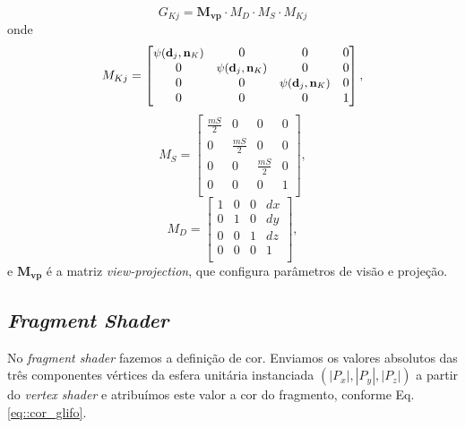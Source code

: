\begin{equation}
    G_{Kj} = \mathbf{M_{vp}}\cdot M_D \cdot M_S \cdot M_{Kj}
\end{equation}
onde 
\begin{equation}
    M_{Kj} = \begin{bmatrix} 
   \mbox{\small $\psi( \mathbf{d}_j, \mathbf{n}_K)$} & 0 & 0 & 0 \\
    0 & \mbox{\small $\psi( \mathbf{d}_j, \mathbf{n}_K)$}  & 0 & 0 \\
    0 & 0 & \mbox{\small $\psi( \mathbf{d}_j, \mathbf{n}_K)$}  & 0 \\
    0 & 0 & 0 & 1 \\
\end{bmatrix},
\end{equation}
\begin{equation}
    M_{S} = \begin{bmatrix} 
    \frac{mS}{2} & 0             & 0            & 0 \\
    0            & \frac{mS}{2} & 0            & 0 \\
    0            & 0             & \frac{mS}{2} & 0 \\
    0            & 0             & 0            & 1 \\
\end{bmatrix},
\end{equation}
\begin{equation}
    M_{D} = \begin{bmatrix} 
    1 & 0 & 0 & dx \\
    0 & 1 & 0 & dy \\
    0 & 0 & 1 & dz \\
    0 & 0 & 0 & 1 \\
\end{bmatrix},
\end{equation}
e $\mathbf{M_{vp}}$ é a matriz \textit{view-projection}, que configura parâmetros de visão e projeção.

\subsection{\textit{Fragment Shader}}

No \textit{fragment shader} fazemos a definição de cor. Enviamos os valores absolutos das três componentes vértices da esfera unitária instanciada $(|P_x|, |P_y|, |P_z|)$ a partir do \textit{vertex shader} e atribuímos este valor a cor do fragmento, conforme Eq. \ref{eq::cor_glifo}.







